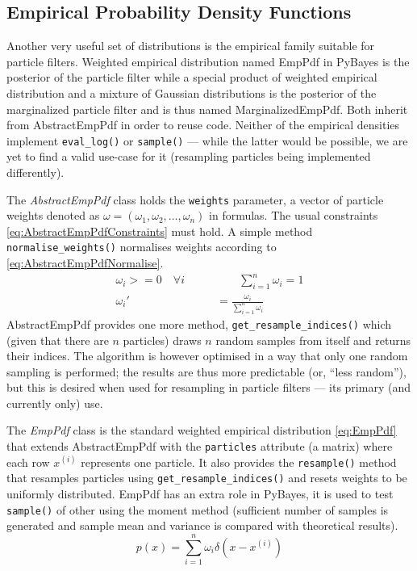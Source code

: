 \subsection{Empirical Probability Density Functions}

Another very useful set of distributions is the empirical family suitable for particle filters.
Weighted empirical distribution named EmpPdf in PyBayes is the posterior {\pdf} of the
particle filter while a special product of weighted empirical distribution and a mixture of Gaussian
distributions is the posterior {\pdf} of the marginalized particle filter and is thus named
MarginalizedEmpPdf. Both inherit from AbstractEmpPdf in order to reuse code. Neither of the empirical
densities implement \verb|eval_log()| or \verb|sample()| --- while the latter would be possible, we
are yet to find a valid use-case for it (resampling particles being implemented differently).

The \emph{AbstractEmpPdf} class holds the \verb|weights| parameter, a vector of particle weights denoted as
\(\omega = (\omega_1, \omega_2, \dotsc, \omega_n)\) in formulas. The usual constraints
\eqref{eq:AbstractEmpPdfConstraints} must hold. A simple method \verb|normalise_weights()| normalises
weights according to \eqref{eq:AbstractEmpPdfNormalise}.
\begin{align}
	\omega_i >= 0 \quad \forall i \quad \quad & \quad \quad \sum_{i=1}^n \omega_i = 1 \label{eq:AbstractEmpPdfConstraints} \\
	\omega_i' &= \frac{\omega_i}{\sum_{i=1}^n \omega_i} \label{eq:AbstractEmpPdfNormalise}
\end{align}
AbstractEmpPdf provides one more method, \verb|get_resample_indices()| which
(given that there are \(n\) particles) draws \(n\) random samples from itself and returns their
indices. The algorithm is however optimised in a way that only one random sampling is performed; the
results are thus more predictable (or, ``less random''), but this is desired when used for resampling
in particle filters --- its primary (and currently only) use.

The \emph{EmpPdf} class is the standard weighted empirical distribution \eqref{eq:EmpPdf} that extends
AbstractEmpPdf with the \verb|particles| attribute (a matrix) where each row \(x^{(i)}\) represents
one particle. It also provides the \verb|resample()| method that resamples particles using
\verb|get_resample_indices()| and resets weights to be uniformly distributed. EmpPdf has an extra
role in PyBayes, it is used to test \verb|sample()| of other {\pdfs} using the moment method
(sufficient number of samples is generated and sample mean and variance is compared with theoretical
results).
\begin{equation} \label{eq:EmpPdf}
	p(x) = \sum_{i=1}^n \omega_i \delta(x - x^{(i)})
\end{equation}

